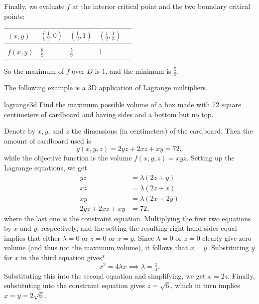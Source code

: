 \documentclass{watsonbook}
\begin{document}
\begin{solution}
    Finally, we evaluate $f$ at the interior critical point and the
    two boundary critical points: \vspace{-12pt}
    \begin{center}
      \begin{tabular}{M{1.2cm}|M{1.2cm}M{1.2cm}M{2cm}N}
        $(x,y)$ & $\left(\frac{1}{2}, 0\right)$  & $\left(\frac{1}{2},
                                1\right)$ &
                                            $\left(\frac{1}{2},
                                            \frac{1}{3} \right)$ &
        \\[12pt] \hline  \\[-8pt] 
        $f(x,y)$ & $\frac{8}{9}$ & $\frac{5}{9}$ & 1 &  \\
      \end{tabular}
    \end{center}
    So the maximum of $f$ over $D$ is $1$, and the minimum is
    $\frac{5}{9}$. 
  \end{solution}

  The following example is a 3D application of Lagrange multipliers. 
  
  \begin{example}{}{lagrange3d}
    Find the maximum possible volume of a box made with 72 square
    centimeters of cardboard and having sides and a bottom but no
    top. 
  \end{example}

  \begin{solution}
    Denote by $x,y$, and $z$ the dimensions (in centimeters) of the
    cardboard. Then the amount of cardboard used is
    \[
      g(x,y,z) = 2yz + 2xz + xy = 72, 
    \]
    while the objective function is the volume $f(x,y,z) =
    xyz$. Setting up the Lagrange equations, we get
    \begin{align*}
      yz &= \lambda(2z + y) \\
      xz &= \lambda(2z + x) \\
      xy &= \lambda(2x + 2y) \\
      2yz + 2xz + xy &= 72, 
    \end{align*}
    where the last one is the constraint equation. Multiplying the
    first two equations by $x$ and $y$, respectively, and the setting
    the resulting right-hand sides equal implies that either $\lambda
    = 0$ or $z= 0$ or  $x = y$. Since $\lambda = 0$ or $z = 0$ clearly
    give zero volume (and thus not the maximum volume), it follows
    that $x=y$. Substituting $y$ for $x$ in the third equation gives*
    \[
      x^2 = 4 \lambda x \implies \lambda = \tfrac{x}{4}. 
    \]
    Substituting this into the second equation and simplifying, we get
    $x = 2z$. Finally, substituting into the constraint equation gives
    $z = \sqrt{6}$, which in turn implies $x = y = 2\sqrt{6}$. 
  \end{solution}
\end{document}
